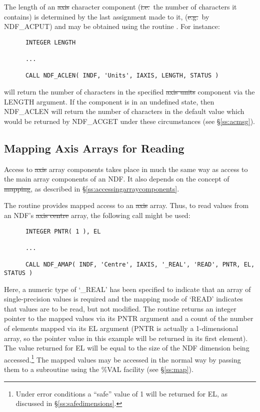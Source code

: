 The length of an \st{axis\/} character component (\st{i.e.}\ the number of
characters it contains) is determined by the last assignment made to it,
(\st{e.g.}\ by NDF\_ACPUT) and may be obtained using the routine
. 
For instance:

\small
\begin{verbatim}
      INTEGER LENGTH

      ...

      CALL NDF_ACLEN( INDF, 'Units', IAXIS, LENGTH, STATUS )
\end{verbatim}
\normalsize

will return the number of characters in the specified \st{axis units\/}
component via the LENGTH argument.
If the component is in an undefined state, then NDF\_ACLEN will return
the number of characters in the default value which would be returned
by NDF\_ACGET under these circumstances (see \S\ref{ss:acmsg}).

\subsection{Mapping Axis Arrays for Reading}

Access to \st{axis\/} array components takes place in much the same way as
access to the main array components of an NDF.
It also depends on the concept of \st{mapping}, as described in
\S\ref{ss:accessingarraycomponents}. 

The routine  provides mapped access to an \st{axis\/} array.
Thus, to read values from an NDF's \st{axis centre\/} array, the following 
call might be used:

\small
\begin{verbatim}
      INTEGER PNTR( 1 ), EL

      ...

      CALL NDF_AMAP( INDF, 'Centre', IAXIS, '_REAL', 'READ', PNTR, EL, STATUS )
\end{verbatim}
\normalsize

Here, a numeric type of `\_REAL' has been specified to indicate that an
array of single-precision values is required and the mapping mode of `READ'
indicates that values are to be read, but not modified. 
The routine returns an integer pointer to the mapped values via its PNTR
argument and a count of the number of elements mapped via its EL argument
(PNTR is actually a 1-dimensional array, so the pointer value in this
example will be returned in its first element). 
The value returned for EL will be equal to the size of the NDF dimension
being accessed.\footnote{Under error conditions a ``safe'' value of 1 will
be returned for EL, as discussed in \S\ref{ss:safedimensions}.} 
The mapped values may be accessed in the normal way by passing them to a
subroutine using the \%VAL facility (see \S\ref{ss:map}). 

